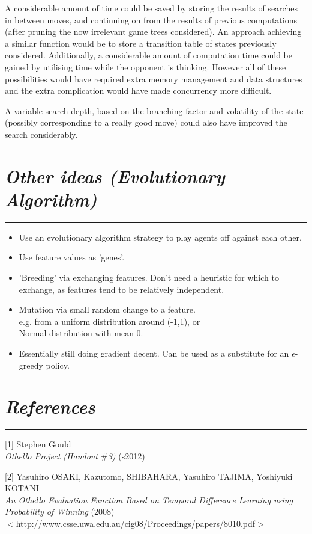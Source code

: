 \documentclass[10pt]{report}
\begin{document}
\begin{multicols}{2}
A considerable amount of time could be saved by storing the results of searches in between moves, and continuing on from the results of previous computations (after pruning the now irrelevant game trees considered). An approach achieving a similar function would be to store a transition table of states previously considered. Additionally, a considerable amount of computation time could be gained by utilising time while the opponent is thinking. However all of these possibilities would have required extra memory management and data structures and the extra complication would have made concurrency more difficult.

A variable search depth, based on the branching factor and volatility of the state (possibly corresponding to a really good move) could also have improved the search considerably.
\section*{\emph{Other ideas (Evolutionary Algorithm)}}
\hrule
    \begin{itemize}
  \item
   	Use an evolutionary algorithm strategy to play agents off against each other.
  \item
	Use feature values as 'genes'.
  \item
	'Breeding' via exchanging features. Don't need a heuristic for which to exchange, as features tend to be relatively independent.
  \item
	Mutation via small random change to a feature.
	\\ e.g. from a uniform distribution around (-1,1), or
	\\ Normal distribution with mean 0.
  \item
	Essentially still doing gradient decent. Can be used as a substitute for an $\epsilon$-greedy policy.
  \end{itemize}
  
\end{multicols}
\newpage
\section*{\emph{References}}
\hrule

[1]
Stephen Gould\\
\emph{Othello Project (Handout $\#$3)} (s2012)
  
[2] Yasuhiro OSAKI, Kazutomo, SHIBAHARA, Yasuhiro TAJIMA, Yoshiyuki KOTANI\\
\emph{An Othello Evaluation Function Based on Temporal Difference Learning using Probability of Winning} (2008)\\
$<$http://www.csse.uwa.edu.au/cig08/Proceedings/papers/8010.pdf$>$
  
\end{document}
